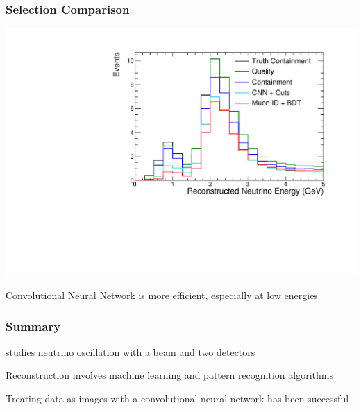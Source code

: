 \documentclass[10pt,professionalfonts,xcolor=table]{beamer}
\begin{document}
\begin{frame}

\frametitle{Selection Comparison}
  \begin{center}
   \includegraphics[height=0.7\textwidth, angle=-90]{figures/selection/cosmic_sig_osc.pdf}
  \end{center}
  \gap
  \bangon
  \item Convolutional Neural Network is more efficient, especially at low energies
  \bangoff
\end{frame}


\begin{frame}
\frametitle{Summary}
\bangon
\item \nova studies neutrino oscillation with a beam and two detectors
\gap
\item Reconstruction involves machine learning and pattern recognition algorithms
\gap
\item Treating data as images with a convolutional neural network has been successful
\bangoff
\end{frame}
\end{document}
